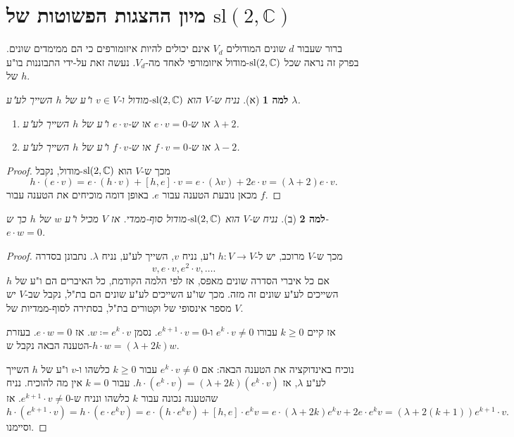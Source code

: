 \documentclass{report}
\theoremstyle{break}
\newtheorem*{unLemma}{למה}
\theoremstyle{MyNonumberbreak}
\newtheorem{proof}{הוכחה}
\begin{document}
\section{מיון ההצגות הפשוטות של $\mathrm{sl}(2, \mathbb{C})$}
ברור שעבור $d$ שונים המודולים $V_d$ אינם יכולים להיות איזומורפים כי הם ממימדים שונים. בפרק זה נראה שכל $\operatorname{sl}(2, \operatorname{\mathbb{C}})$-מודול איזומורפי לאחד מה-$V_d$. נעשה זאת על-ידי התבוננות בו"ע של $h$.
\begin{unLemma}[א]
	נניח ש-$V$ הוא $\operatorname{sl}(2, \operatorname{\mathbb{C}})$-מודול ו-$v \in V$ ו"ע של $h$ השייך לע"ע $\lambda$.
	\begin{enumerate}
		\item 
		או ש-$e \cdot v = 0$ או ש-$e \cdot v$ ו"ע של $h$ השייך לע"ע $\lambda+2$.
		\item
		או ש-$f \cdot v = 0$ או ש-$f \cdot v$ ו"ע של $h$ השייך לע"ע $\lambda-2$.
	\end{enumerate}
\end{unLemma}
\begin{proof}
	מכך ש-$V$ הוא $\operatorname{sl}(2, \operatorname{\mathbb{C}})$-מודול, נקבל
	\[ h \cdot (e \cdot v) = e \cdot (h \cdot v) + [h, e] \cdot v = e \cdot (\lambda v) + 2e \cdot v = (\lambda + 2)e \cdot v. \]
	מכאן נובעת הטענה עבור $e$. באופן דומה מוכיחים את הטענה עבור $f$.
\end{proof}
\begin{unLemma}[ב]
	נניח ש-$V$ הוא $\operatorname{sl}(2, \operatorname{\mathbb{C}})$-מודול סוף-ממדי. אז $V$ מכיל ו"ע $w$ של $h$ כך ש-$e \cdot w = 0$.
\end{unLemma}
\begin{proof}
	מכך ש-$V$ מרוכב, יש ל-$h : V \to V$ ו"ע, נניח $v$, השייך לע"ע, נניח $\lambda$. נתבונן בסדרה
	\[ v, e \cdot v, e^2 \cdot v, \ldots. \]
	אם כל איברי הסדרה שונים מאפס, אז לפי הלמה הקודמת, כל האיברים הם ו"ע של $h$ השייכים לע"ע שונים זה מזה. מכך שו"ע השייכים לע"ע שונים הם בת"ל, נקבל שב-$V$ יש מספר אינסופי של וקטורים בת"ל, בסתירה לסוף-ממדיות של $V$.
	
	אז קיים $k \ge 0$ עבורו $e^k \cdot v \neq 0$ ו-$e^{k+1} \cdot v = 0$. נסמן $w \coloneqq e^k \cdot v$. אז $e \cdot w = 0$. בעזרת הטענה הבאה נקבל ש-$h \cdot w = (\lambda + 2k)w$.
	
	נוכיח באינדוקציה את הטענה הבאה: אם $e^k \cdot v \neq 0$ עבור $k \ge 0$ כלשהו ו-$v$ ו"ע של $h$ השייך לע"ע $\lambda$, אז $h \cdot (e^k \cdot v) = (\lambda + 2k)(e^k \cdot v)$. עבור $k = 0$ אין מה להוכיח. נניח שהטענה נכונה עבור $k$ כלשהו ונניח ש-$e^{k+1} \cdot v \neq 0$. אז
	\[ h \cdot (e^{k+1} \cdot v) = h \cdot (e \cdot e^k v) = e \cdot (h \cdot e^k v) + [h, e] \cdot e^k v = e \cdot (\lambda + 2k)e^k v + 2e \cdot e^k v = (\lambda + 2(k + 1))e^{k+1} \cdot v. \]
	וסיימנו.	
\end{proof}
\end{document}
